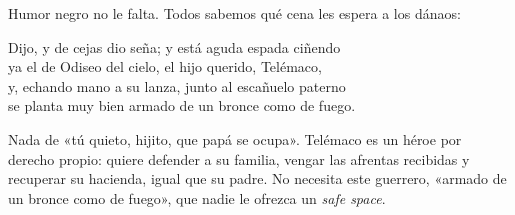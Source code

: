 Humor negro no le falta. Todos sabemos qué cena les espera a los dánaos:

\begin{versocita}
Dijo, y de cejas dio seña; y está aguda espada ciñendo\\
ya el de Odiseo del cielo, el hijo querido, Telémaco,\\
y, echando mano a su lanza, junto al escañuelo paterno\\
se planta muy bien armado de un bronce como de fuego.
\end{versocita}

Nada de «tú quieto, hijito, que papá se ocupa». Telémaco es un héroe por derecho propio: quiere defender a su familia, vengar las afrentas recibidas y recuperar su hacienda, igual que su padre. No necesita este guerrero, «armado de un bronce como de fuego», que nadie le ofrezca un \emph{safe space}.
